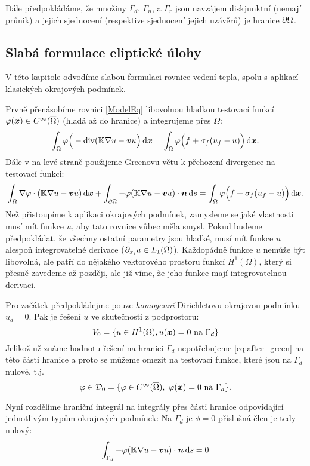 Dále předpokládáme, že množiny $\Gamma_d$, $\Gamma_n$, a $\Gamma_r$ jsou navzájem diskjunktní (nemají průnik) a jejich sjednocení (respektive sjednocení jejich uzávěrů)
je hranice $\partial \Omega$.


\subsection{Slabá formulace eliptické úlohy}
\label{sec:weak_form_elliptic_eq}

V této kapitole odvodíme slabou formulaci rovnice vedení tepla, spolu s aplikací klasických okrajových podmínek.

Prvně přenásobíme rovnici \eqref{ModelEq} libovolnou hladkou testovací funkcí $\varphi(\mathbf{\boldsymbol{x}}) \in C^\infty(\overline{\Omega})$ (hladá až do hranice) a integrujeme přes $\Omega$:
\[
    \int_\Omega \varphi\Big(-\operatorname{div}({\mathbb{K}}\nabla u-\mathbf{\boldsymbol{v}} u\Big) \,{\rm d} \mathbf{\boldsymbol{x}} = \int_\Omega \varphi \Big(f + \sigma_f(u_f - u)\Big) \,{\rm d} \mathbf{\boldsymbol{x}}.
\]
Dále v na levé straně použijeme Greenovu větu k přehození divergence na testovací funkci:
\begin{equation}
    \label{eq:after_green}
    \int_\Omega \nabla \varphi \cdot ({\mathbb{K}}\nabla u-\mathbf{\boldsymbol{v}} u) \,{\rm d} \mathbf{\boldsymbol{x}} + \int_{\partial \Omega} -\varphi({\mathbb{K}}\nabla u-\mathbf{\boldsymbol{v}} u)\cdot \mathbf{\boldsymbol{n}} \,{\rm d} s 
    = \int_\Omega \varphi \Big(f + \sigma_f(u_f - u)\Big) \,{\rm d} \mathbf{\boldsymbol{x}}.
\end{equation}
Než přistoupíme k aplikaci okrajových podmínek, zamysleme se jaké vlastnosti musí mít funkce $u$, aby tato rovnice vůbec měla smysl. Pokud budeme předpokládat, že 
všechny ostatní parametry jsou hladké, musí mít funkce $u$ alespoň integrovatelné derivace ($\partial_{x_i} u \in L_1(\Omega)$). Každopádně funkce $u$ nemůže být libovolná, 
ale patří do nějakého vektorového prostoru funkcí $H^1(\Omega)$, který si přesně zavedeme až později, ale již víme, že jeho funkce mají integrovatelnou derivaci.

Pro začátek předpokládejme pouze \emph{homogenní} Dirichletovu okrajovou podmínku $u_d =0$. Pak je řešení $u$ ve skutečnosti z podprostoru:
\[
    V_0 = \{ u\in H^1(\Omega), u(\mathbf{\boldsymbol{x}}) = 0\text{ na } \Gamma_d \}
\]
Jelikož už známe hodnotu řešení na hranici $\Gamma_d$ nepotřebujeme \eqref{eq:after_green} na této části hranice a proto se můžeme omezit na testovací funkce, které 
jsou na $\Gamma_d$ nulové, t.j. 
\[
    \varphi \in \mathcal D_0 = \{\varphi \in C^\infty(\overline{\Omega}),\ \varphi(\mathbf{\boldsymbol{x}}) = 0\text{ na } \Gamma_d\}.
\]

Nyní rozdělíme hraniční integrál na integrály přes části hranice odpovídající jednotlivým typům okrajových podmínek:
Na $\Gamma_d$ je $\phi=0$ příslušná člen je tedy nulový:
\[
    \int_{\Gamma_d} -\varphi({\mathbb{K}}\nabla u-\mathbf{\boldsymbol{v}} u)\cdot \mathbf{\boldsymbol{n}} \,{\rm d} s = 0
\]

